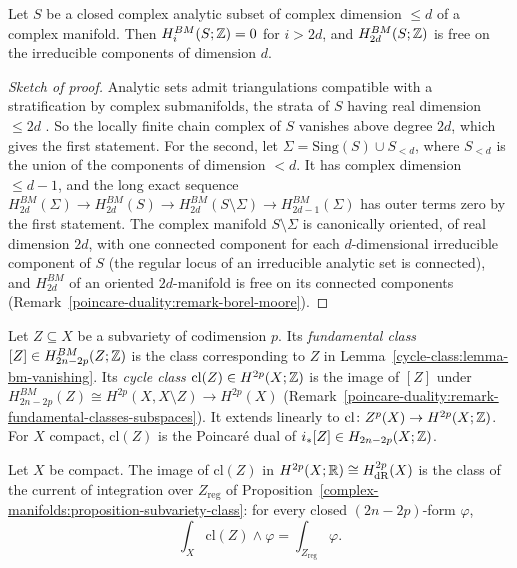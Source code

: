 \begin{lemma}\label{cycle-class:lemma-bm-vanishing}
Let $S$ be a closed complex analytic subset of complex dimension $\leq d$ of a complex manifold. Then $H^{BM}_i(S; \mathbb{Z}) = 0$ for $i > 2d$, and $H^{BM}_{2d}(S; \mathbb{Z})$ is free on the
irreducible components of dimension $d$.
\end{lemma}

\begin{proof}[Sketch of proof]
Analytic sets admit triangulations compatible with a stratification by complex submanifolds, the strata of $S$ having real dimension $\leq 2d$
\cite[Chapter 19]{fulton-intersection}. So the locally finite chain complex of $S$ vanishes above degree $2d$, which gives the first statement. For the second, let
$\Sigma = \mathrm{Sing}(S) \cup S_{<d}$, where $S_{<d}$ is the union of the components of dimension $< d$. It has complex dimension $\leq d - 1$, and the long exact sequence
$H^{BM}_{2d}(\Sigma) \to H^{BM}_{2d}(S) \to H^{BM}_{2d}(S \setminus \Sigma) \to H^{BM}_{2d-1}(\Sigma)$ has outer terms zero by the first statement. The complex manifold $S \setminus \Sigma$ is
canonically oriented, of real dimension $2d$, with one connected component for each $d$-dimensional irreducible component of $S$ (the regular locus of an irreducible analytic set is
connected), and $H^{BM}_{2d}$ of an oriented $2d$-manifold is free on its connected components (Remark~\ref{poincare-duality:remark-borel-moore}).
\end{proof}

\begin{definition}\label{cycle-class:definition-cycle-class}
Let $Z \subseteq X$ be a subvariety of codimension $p$. Its \emph{fundamental class} $[Z] \in H^{BM}_{2n-2p}(Z; \mathbb{Z})$ is the class corresponding to $Z$ in
Lemma~\ref{cycle-class:lemma-bm-vanishing}. Its \emph{cycle class} $\mathrm{cl}(Z) \in H^{2p}(X; \mathbb{Z})$ is the image of $[Z]$ under
$H^{BM}_{2n-2p}(Z) \cong H^{2p}(X, X \setminus Z) \to H^{2p}(X)$ (Remark~\ref{poincare-duality:remark-fundamental-classes-subspaces}). It extends linearly to
$\mathrm{cl} \colon Z^p(X) \to H^{2p}(X; \mathbb{Z})$. For $X$ compact, $\mathrm{cl}(Z)$ is the Poincar\'e dual of $i_*[Z] \in H_{2n-2p}(X; \mathbb{Z})$.
\end{definition}

\begin{proposition}\label{cycle-class:proposition-current}
Let $X$ be compact. The image of $\mathrm{cl}(Z)$ in $H^{2p}(X; \mathbb{R}) \cong H^{2p}_{\mathrm{dR}}(X)$ is the class of the current of integration over $Z_{\mathrm{reg}}$ of
Proposition~\ref{complex-manifolds:proposition-subvariety-class}: for every closed $(2n - 2p)$-form $\varphi$,
\[
\int_X\mathrm{cl}(Z) \wedge \varphi = \int_{Z_{\mathrm{reg}}}\varphi .
\]
\end{proposition}

